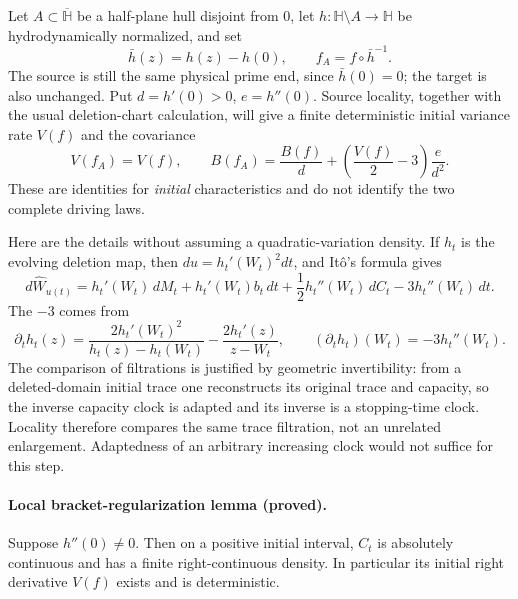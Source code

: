 \documentclass[11pt]{article}
\theoremstyle{definition}\newtheorem{definition}[theorem]{Definition}
\theoremstyle{remark}\newtheorem{remark}[theorem]{Remark}
\begin{document}
Let $A\subset\overline{\mathbb H}$ be a half-plane hull disjoint from $0$,
let $h:\mathbb H\setminus A\to\mathbb H$ be hydrodynamically normalized,
and set
\[
 \bar h(z)=h(z)-h(0),\qquad f_A=f\circ\bar h^{-1}.
 \tag{DR3}
\]
The source is still the same physical prime end, since $\bar h(0)=0$;
the target is also unchanged.  Put $d=h'(0)>0$, $e=h''(0)$.
Source locality, together with the usual deletion-chart calculation, will
give a finite deterministic initial variance rate $V(f)$ and the covariance
\[
 \boxed{\quad V(f_A)=V(f),\qquad
 B(f_A)=\frac{B(f)}{d}
       +\left(\frac{V(f)}2-3\right)\frac{e}{d^2}.\quad}
 \tag{DR4}
\]
These are identities for \emph{initial} characteristics and do not identify
the two complete driving laws.

Here are the details without assuming a quadratic-variation density.
If $h_t$ is the evolving deletion map, then $du=h_t'(W_t)^2dt$, and
It\^o's formula gives
\[
 d\widehat W_{u(t)}
  =h_t'(W_t)\,dM_t+h_t'(W_t)b_t\,dt
       +\frac12 h_t''(W_t)\,dC_t-3h_t''(W_t)\,dt.
 \tag{DR5}
\]
The $-3$ comes from
\[
 \partial_t h_t(z)
 =\frac{2h_t'(W_t)^2}{h_t(z)-h_t(W_t)}
       -\frac{2h_t'(z)}{z-W_t},\qquad
 (\partial_t h_t)(W_t)=-3h_t''(W_t).
\]
The comparison of filtrations is justified by geometric invertibility:
from a deleted-domain initial trace one reconstructs its original trace and
capacity, so the inverse capacity clock is adapted and its inverse is a
stopping-time clock.  Locality therefore compares the same trace filtration,
not an unrelated enlargement.  Adaptedness of an arbitrary increasing clock
would not suffice for this step.

\paragraph{Local bracket-regularization lemma (proved).}
Suppose $h''(0)\ne0$.  Then on a positive initial interval, $C_t$ is absolutely
continuous and has a finite right-continuous density.  In particular its
initial right derivative $V(f)$ exists and is deterministic.
\end{document}
